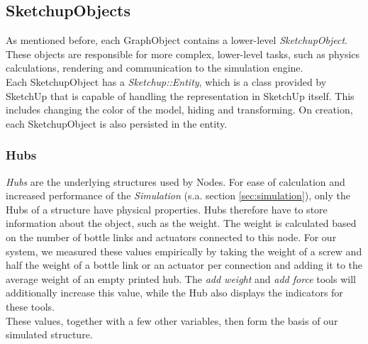 \subsection{SketchupObjects}
As mentioned before, each GraphObject contains a lower-level \textit{SketchupObject}. These objects are responsible for more complex, lower-level tasks, such as physics calculations, rendering and communication to the simulation engine.\\
Each SketchupObject has a \textit{Sketchup::Entity}, which is a class provided by SketchUp that is capable of handling the representation in SketchUp itself. This includes changing the color of the model, hiding and transforming. On creation, each SketchupObject is also persisted in the entity.
\subsubsection{Hubs}
\textit{Hubs} are the underlying structures used by Nodes. For ease of calculation and increased performance of the \textit{Simulation} (s.a. section \ref{sec:simulation}), only the Hubs of a structure have physical properties. Hubs therefore have to store information about the object, such as the weight. The weight is calculated based on the number of bottle links and actuators connected to this node. For our system, we measured these values empirically by taking the weight of a screw and half the weight of a bottle link or an actuator per connection and adding it to the average weight of an empty printed hub. The \textit{add weight} and \textit{add force} tools will additionally increase this value, while the Hub also displays the indicators for these tools.\\
These values, together with a few other variables, then form the basis of our simulated structure.
